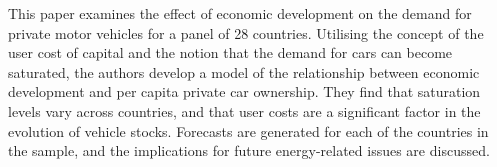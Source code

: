 This paper examines the effect of economic development on the demand for private motor vehicles for a panel of 28 countries. Utilising the concept of the user cost of capital and the notion that the demand for cars can become saturated, the authors develop a model of the relationship between economic development and per capita private car ownership. They find that saturation levels vary across countries, and that user costs are a significant factor in the evolution of vehicle stocks. Forecasts are generated for each of the countries in the sample, and the implications for future energy-related issues are discussed.
